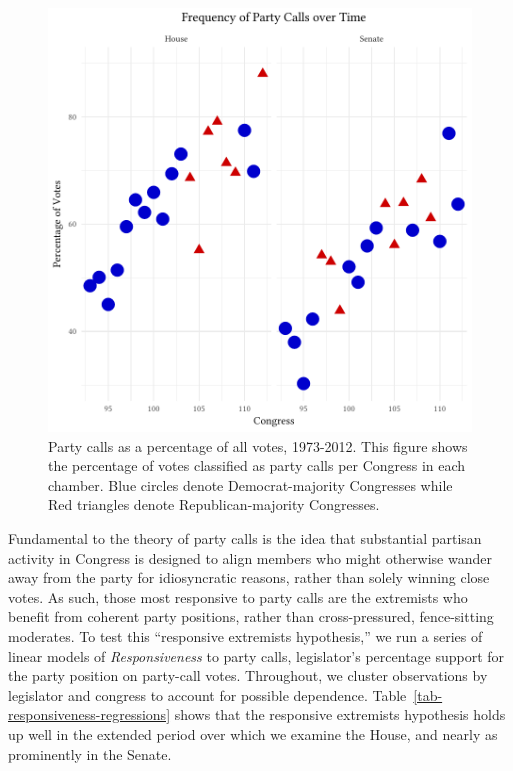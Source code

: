 \documentclass[12pt]{article}
\begin{document}
\begin{figure}[p]
\centering
\includegraphics[width = \textwidth]{party_call_percent_both.pdf}
\caption{Party calls as a percentage of all votes, 1973-2012.
This figure shows the percentage of votes classified as party calls per Congress in each chamber. Blue circles denote Democrat-majority Congresses while Red triangles denote Republican-majority Congresses.
\label{fig-party-calls-over-time}}
\end{figure}

Fundamental to the theory of party calls is the idea that substantial partisan activity in Congress is designed to align members who might otherwise wander away from the party for idiosyncratic reasons, rather than solely winning close votes. As such, those most responsive to party calls are the extremists who benefit from coherent party positions, rather than cross-pressured, fence-sitting moderates.  To test this ``responsive extremists hypothesis,'' we run a series of linear models of \textit{Responsiveness} to party calls, legislator's percentage support for the party position on party-call votes.  Throughout, we cluster observations by legislator and congress to account for possible dependence.  Table~\ref{tab-responsiveness-regressions} shows that the responsive extremists hypothesis holds up well in the extended period over which we examine the House, and nearly as prominently in the Senate.
\end{document}
